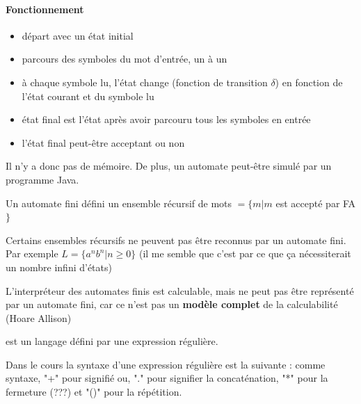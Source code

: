 \paragraph{Fonctionnement}
\begin{itemize}
	\item départ avec un état initial
	\item parcours des symboles du mot d'entrée, un à un
	\item à chaque symbole lu, l'état change (fonction de transition 
		$\delta$) en fonction de l'état courant et du symbole lu
	\item état final est l'état après avoir parcouru tous les symboles en 
		entrée
	\item l'état final peut-être acceptant ou non
\end{itemize}

\begin{myrem}
	Il n'y a donc pas de mémoire. De plus, un automate peut-être simulé 
	par un programme Java.
\end{myrem}

\begin{myprop}
	Un automate fini défini un ensemble récursif de mots $=\{m|m$ est 
		accepté par FA$\}$
\end{myprop}

\begin{myprop}
	Certains ensembles récursifs ne peuvent pas être reconnus par un 
	automate fini. Par exemple $L = \{ a^n b^n | n\geq 0\}$ (il me semble que 
	c'est par ce que ça nécessiterait un nombre infini d'états)
\end{myprop}

\begin{myprop}
	L'interpréteur des automates finis est calculable, mais ne peut pas être 
	représenté par un automate fini, car ce n'est pas un \textbf{modèle 
	complet} de la calculabilité (Hoare Allison)
\end{myprop}

\begin{mydef} est un langage défini par une expression 
	régulière.
\end{mydef}

\begin{mydef} 
       	Dans le cours la syntaxe d'une expression régulière est la suivante :
	comme syntaxe, "+" pour signifié ou, "." pour signifier la concaténation, "*" pour la 
	fermeture (???) et "()" pour la répétition.
\end{mydef}


